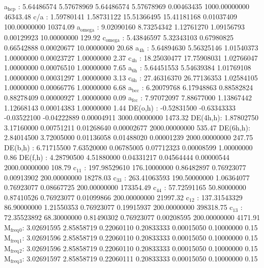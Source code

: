 \documentclass[11pt]{article}
\begin{document}
a\(_{\text{hcp}}\)   :   5.64486574   5.57678969   5.64486574   5.57678969   0.00463435 1000.00000000     46343.48
c/a     :   1.59780141   1.58731122  15.51366495  15.41181168   0.01037409 100.00000000     10374.09
a\(_{\text{omega}}\) :   9.02090160   8.73254342   1.12761270   1.09156793   0.00129923  10.00000000       129.92
c\(_{\text{omega}}\) :   5.43846597   5.32343103   0.67980825   0.66542888   0.00020677  10.00000000        20.68
a\(_{\text{4h}}\)    :   5.64894630   5.56325146   1.01540373   1.00000000   0.00023727   1.00000000         2.37
c\(_{\text{4h}}\)    :  18.25030477  17.75908031   1.02766047   1.00000000   0.00076510   1.00000000         7.65
a\(_{\text{6h}}\)    :   5.64451553   5.54639384   1.01769108   1.00000000   0.00031297   1.00000000         3.13
c\(_{\text{6h}}\)    :  27.46316370  26.77136353   1.02584105   1.00000000   0.00066776   1.00000000         6.68
a\(_{\text{bcc}}\)   :   6.20079768   6.17948863   0.88582824   0.88278409   0.00000927   1.00000000         0.09
a\(_{\text{fcc}}\)   :   7.97072097   7.88677000   1.13867442   1.12668143   0.00014383   1.00000000         1.44
DE(o,h) :  -0.52831500  -0.63343333  -0.03522100  -0.04222889   0.00004911 3000.00000000      1473.32
DE(4h,h):   1.87802750   3.17160000   0.00751211   0.01268640   0.00002677 2000.00000000       535.47
DE(6h,h):   2.84014500   3.72005000   0.01136058   0.01488020   0.00001239 2000.00000000       247.75
DE(b,h) :   6.71715500   7.63520000   0.06785005   0.07712323   0.00008599   1.00000000         0.86
DE(f,h) :   4.28790500   4.51880000   0.04331217   0.04564444   0.00000544 2000.00000000       108.79
c\(_{\text{11}}\)    : 197.98529610 176.10000000   0.86482897   0.76923077   0.00913902 200.00000000     18278.03
c\(_{\text{33}}\)    : 263.41063593 190.50000000   1.06364077   0.76923077   0.08667725 200.00000000    173354.49
c\(_{\text{44}}\)    :  57.72591165  50.80000000   0.87410526   0.76923077   0.01099866 200.00000000     21997.32
c\(_{\text{12}}\)    : 137.31543329  86.90000000   1.21550353   0.76923077   0.19915937 200.00000000    398318.75
c\(_{\text{13}}\)    :  72.35523892  68.30000000   0.81490302   0.76923077   0.00208595 200.00000000      4171.91
M\(_{\text{freq}}\)\(_{\text{0}}\):   3.02691595   2.85858719   0.22060110   0.20833333   0.00015050   0.10000000         0.15
M\(_{\text{freq}}\)\(_{\text{1}}\):   3.02691596   2.85858719   0.22060110   0.20833333   0.00015050   0.10000000         0.15
M\(_{\text{freq}}\)\(_{\text{2}}\):   3.02691596   2.85858719   0.22060110   0.20833333   0.00015050   0.10000000         0.15
M\(_{\text{freq}}\)\(_{\text{3}}\):   3.02691597   2.85858719   0.22060111   0.20833333   0.00015050   0.10000000         0.15
\end{document}
